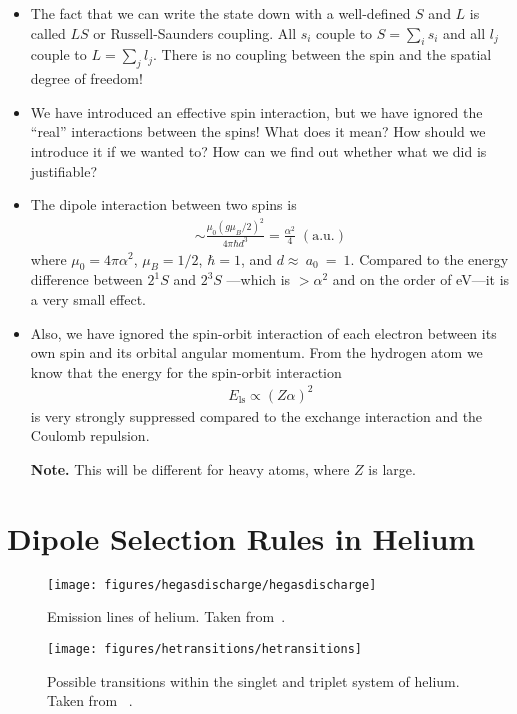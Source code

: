 \documentclass[10pt]{article}
\let\cite\citep
\providecommand\citep{\cite}
\begin{document}
\begin{itemize}
\item The fact that we can write the state down with a well-defined $S$ and $L$ is called $LS$ or Russell-Saunders coupling. All $s_i$ couple to $S = \sum_i s_i$ and all $l_j$ couple to $L=\sum_j l_j$. There is no coupling between the spin and the spatial degree of freedom!
\end{itemize}

\begin{itemize}
\item We have introduced an effective spin interaction, but we have ignored the ``real'' interactions between the spins! What does it mean? How should we introduce it if we wanted to? How can we find out whether what we did is justifiable?
\item The dipole interaction between two spins is %
\begin{align}
\sim\frac{\mu_0(g \mu_B/2)^2}{4\pi \hbar d^3} = \frac{\alpha^2}{4} \;(\text{a.u.})
\end{align}
where $\mu_0 = 4\pi \alpha^2$, $\mu_B=1/2$, $\hbar=1$, and $d\approx~a_0~=~1$.
Compared to the energy difference between $2^1S$ and $2^3S$ ---which is $>\alpha^2$ and on the order of \si{\electronvolt}---it is a very small effect.

%
\item Also, we have ignored the spin-orbit interaction of each electron between its own spin and its orbital angular momentum. From the hydrogen atom we know that the energy for the spin-orbit interaction
\begin{align}
E_\textrm{ls} \propto (Z\alpha)^2
\end{align}
%
is very strongly suppressed compared to the exchange interaction and the Coulomb repulsion.

\textbf{Note.} This will be different for heavy atoms, where $Z$ is large.
\end{itemize}

\section{Dipole Selection Rules in Helium}
\begin{figure}[h!]
\begin{center}
\texttt{[image: figures/hegasdischarge/hegasdischarge]}
\caption{{Emission lines of helium. Taken from~\protect\cite{wikipedia}.
{\label{372421}}%
}}
\end{center}
\end{figure}
\begin{figure}[h!]
\begin{center}
\texttt{[image: figures/hetransitions/hetransitions]}
\caption{{Possible transitions within the singlet and triplet system of helium.
Taken from~\protect\cite{Demtr_der_2010} .
{\label{585159}}%
}}
\end{center}
\end{figure}
\end{document}
